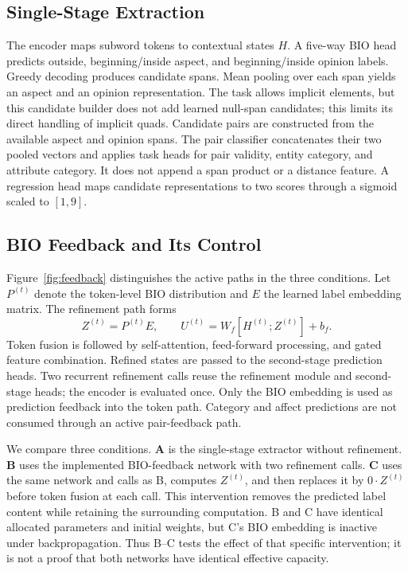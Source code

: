 \documentclass[conference]{IEEEtran}
\begin{document}
\subsection{Single-Stage Extraction}
The encoder maps subword tokens to contextual states $H$. A five-way BIO head predicts outside, beginning/inside aspect, and beginning/inside opinion labels. Greedy decoding produces candidate spans. Mean pooling over each span yields an aspect and an opinion representation. The task allows implicit elements, but this candidate builder does not add learned null-span candidates; this limits its direct handling of implicit quads. Candidate pairs are constructed from the available aspect and opinion spans. The pair classifier concatenates their two pooled vectors and applies task heads for pair validity, entity category, and attribute category. It does not append a span product or a distance feature. A regression head maps candidate representations to two scores through a sigmoid scaled to $[1,9]$.

\subsection{BIO Feedback and Its Control}

Figure~\ref{fig:feedback} distinguishes the active paths in the three conditions.
Let $P^{(t)}$ denote the token-level BIO distribution and $E$ the learned label embedding matrix. The refinement path forms
\begin{equation}
 Z^{(t)}=P^{(t)}E,\qquad
 U^{(t)}=W_f[H^{(t)};Z^{(t)}]+b_f.
\end{equation}
Token fusion is followed by self-attention, feed-forward processing, and gated feature combination. Refined states are passed to the second-stage prediction heads. Two recurrent refinement calls reuse the refinement module and second-stage heads; the encoder is evaluated once. Only the BIO embedding is used as prediction feedback into the token path. Category and affect predictions are not consumed through an active pair-feedback path.

We compare three conditions. \textbf{A} is the single-stage extractor without refinement. \textbf{B} uses the implemented BIO-feedback network with two refinement calls. \textbf{C} uses the same network and calls as B, computes $Z^{(t)}$, and then replaces it by $0\cdot Z^{(t)}$ before token fusion at each call. This intervention removes the predicted label content while retaining the surrounding computation. B and C have identical allocated parameters and initial weights, but C's BIO embedding is inactive under backpropagation. Thus B--C tests the effect of that specific intervention; it is not a proof that both networks have identical effective capacity.
\end{document}
